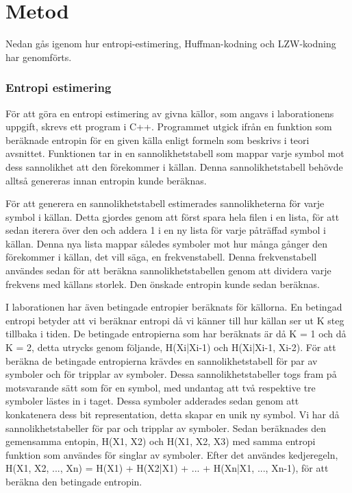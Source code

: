 
\chapter{Metod}
\label{cha:method}

Nedan gås igenom hur entropi-estimering, Huffman-kodning och LZW-kodning har genomförts.

\subsection{Entropi estimering}
För att göra en entropi estimering av givna källor, som angavs i laborationens uppgift, skrevs ett program i C++. Programmet utgick ifrån en funktion som beräknade entropin för en given källa enligt formeln som beskrivs i teori avsnittet. Funktionen tar in en sannolikhetstabell som mappar varje symbol mot dess sannolikhet att den förekommer i källan. Denna sannolikhetstabell behövde alltså genereras innan entropin kunde beräknas.

För att generera en sannolikhetstabell estimerades sannolikheterna för varje symbol i källan. Detta gjordes genom att först spara hela filen i en lista, för att sedan iterera över den och addera 1 i en ny lista för varje påträffad symbol i källan. Denna nya lista mappar således symboler mot hur många gånger den förekommer i källan, det vill säga, en frekvenstabell. Denna frekvenstabell användes sedan för att beräkna sannolikhetstabellen genom att dividera varje frekvens med källans storlek. Den önskade entropin kunde sedan beräknas.

I laborationen har även betingade entropier beräknats för källorna. En betingad entropi betyder att vi beräknar entropi då vi känner till hur källan ser ut K steg tillbaka i tiden. De betingade entropierna som har beräknats är då K = 1 och då K = 2, detta utrycks genom följande, H(Xi|Xi-1) och H(Xi|Xi-1, Xi-2). För att beräkna de betingade entropierna krävdes en sannolikhetstabell för par av symboler och för tripplar av symboler. Dessa sannolikhetstabeller togs fram på motsvarande sätt som för en symbol, med undantag att två respektive tre symboler lästes in i taget. Dessa symboler adderades sedan genom att konkatenera dess bit representation, detta skapar en unik ny symbol. Vi har då sannolikhetstabeller för par och tripplar av symboler. Sedan beräknades den gemensamma entopin, H(X1, X2) och H(X1, X2, X3) med samma entropi funktion som användes för singlar av symboler. Efter det användes kedjeregeln, H(X1, X2, ..., Xn) = H(X1) + H(X2|X1) + ... + H(Xn|X1, ..., Xn-1), för att beräkna den betingade entropin.

